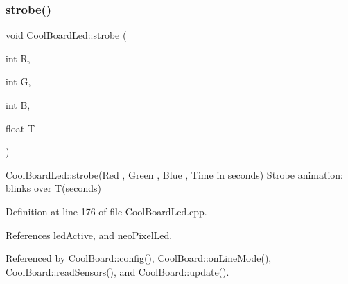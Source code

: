 \subsubsection{\texorpdfstring{strobe()}{strobe()}}
{\footnotesize\ttfamily void Cool\+Board\+Led\+::strobe (\begin{DoxyParamCaption}\item[{int}]{R,  }\item[{int}]{G,  }\item[{int}]{B,  }\item[{float}]{T }\end{DoxyParamCaption})}

Cool\+Board\+Led\+::strobe(\+Red , Green , Blue , Time in seconds) Strobe animation\+: blinks over T(seconds) 

Definition at line 176 of file Cool\+Board\+Led.\+cpp.



References led\+Active, and neo\+Pixel\+Led.



Referenced by Cool\+Board\+::config(), Cool\+Board\+::on\+Line\+Mode(), Cool\+Board\+::read\+Sensors(), and Cool\+Board\+::update().


